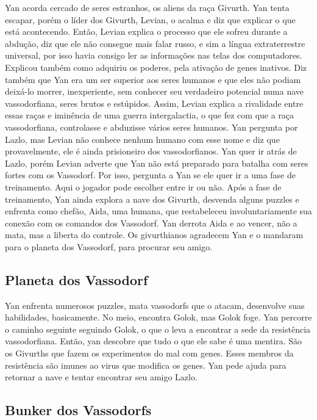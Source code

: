 \documentclass[12pt, a4paper]{article}
\begin{document}
	Yan acorda cercado de seres estranhos, os aliens da raça Givurth.
    Yan tenta escapar, porém o líder dos Givurth, Levian, o acalma e diz
    que explicar o que está acontecendo. Então, Levian explica o processo
    que ele sofreu durante a abdução, diz que ele não consegue mais falar
    russo, e sim a língua extraterrestre universal, por isso havia 
    consigo ler as informações nas telas dos computadores. Explicou 
    também como adquiriu os poderes, pela ativação de genes inativos.
    Diz também que Yan era um ser superior aos seres humanos e que eles
    não podiam deixá-lo morrer, inexperiente, sem conhecer seu 
    verdadeiro potencial numa nave vassodorfiana, seres brutos e 
    estúpidos. Assim, Levian explica a rivalidade entre essas raças e 
    iminência de uma guerra intergalactia, o que fez com que a raça 
    vassodorfiana, controlasse e abduzisse vários seres humanos. Yan 
    pergunta por Lazlo, mas Levian não conhece nenhum humano com esse 
    nome e diz que provavelmente, ele é ainda prisioneiro dos 
    vassodorfianos. Yan quer ir atrás de Lazlo, porém Levian adverte 
    que Yan não está preparado para batalha com seres fortes com os 
    Vassodorf. Por isso, pergunta a Yan se ele quer ir a uma fase de 
    treinamento. Aqui o jogador pode escolher entre ir ou não. Após a 
    fase de treinamento, Yan ainda explora a nave dos Givurth, desvenda 
    alguns puzzles e enfrenta como chefão, Aida, uma humana, que 
    restabeleceu involuntariamente sua conexão com os comandos dos 
    Vassodorf. Yan derrota Aida e ao vencer, não a mata, mas a liberta 
    do controle. Os givurthianos agradecem Yan e o mandaram para o 
    planeta dos Vassodorf, para procurar seu amigo.
	
	\subsection{Planeta dos Vassodorf}

	Yan enfrenta numerosos puzzles, mata vassodorfs que o atacam, 
    desenvolve suas habilidades, basicamente. No meio, encontra Golok, 
    mas Golok foge. Yan percorre o caminho seguinte seguindo Golok, o 
    que o leva a encontrar a sede da resistência vassodorfiana. Então,
    yan descobre que tudo o que ele sabe é uma mentira. São os Givurths
    que fazem os experimentos do mal com genes. Esses membros da 
    resistência são imunes ao virus que modifica os genes. Yan pede 
    ajuda para retornar a nave e tentar encontrar seu amigo Lazlo.

	\subsection{Bunker dos Vassodorfs}
\end{document}
